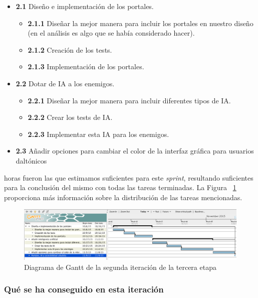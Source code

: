 \begin{itemize}
  \item \textbf{2.1} Diseño e implementación de los portales.
    \begin{itemize}
      \item \textbf{2.1.1} Diseñar la mejor manera para incluir los portales en nuestro diseño (en el análisis es algo que se había considerado hacer).
      \item \textbf{2.1.2} Creación de los tests.
      \item \textbf{2.1.3} Implementación de los portales.
    \end{itemize}
  \item \textbf{2.2} Dotar de IA a los enemigos.
  	\begin{itemize}
      \item \textbf{2.2.1} Diseñar la mejor manera para incluir diferentes tipos de IA.
      \item \textbf{2.2.2} Crear los tests de IA.
      \item \textbf{2.2.3} Implementar esta IA para los enemigos.
    \end{itemize}
  \item \textbf{2.3} Añadir opciones para cambiar el color de la interfaz gráfica para usuarios daltónicos
\end{itemize}

 horas fueron las que estimamos suficientes para este \textit{sprint}, resultando suficientes para la conclusión del mismo con todas las tareas terminadas. La Figura ~\ref{fig:sec3it2} proporciona más información sobre la distribución de las tareas mencionadas.

\begin{figure}
    \includegraphics[width=\textwidth,height=\textheight,keepaspectratio]{./img/sec3it2.png}
  \caption{Diagrama de Gantt de la segunda iteración de la tercera etapa}
  \label{fig:sec3it2}
\end{figure}

\subsubsection{Qué se ha conseguido en esta iteración}

